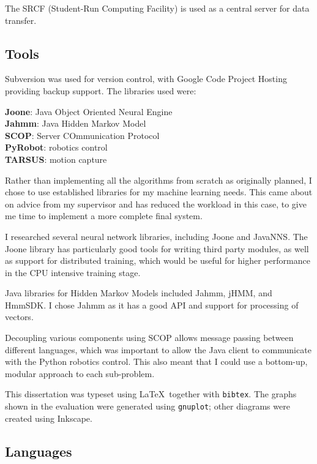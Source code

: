 \documentclass[12pt,a4,notitlepage]{report}
\renewcommand{\_}{\texttt{\symbol{95}}}
\newcommand{\<}{\texttt{\symbol{60}}}
\renewcommand{\>}{\texttt{\symbol{62}}}
\begin{document}
The SRCF (Student-Run Computing Facility\cite{SRCF}) is used as a central server for data transfer.

\subsection{Tools}

Subversion was used for version control, with Google Code Project Hosting providing backup support. The libraries used were:

\textbf{Joone}: Java Object Oriented Neural Engine \cite{Joone}\\
\textbf{Jahmm}: Java Hidden Markov Model \cite{Jahmm} \\
\textbf{SCOP}: Server COmmunication Protocol \cite{SCOP} \\
\textbf{PyRobot}: robotics control \cite{PyRobot}\\
\textbf{TARSUS}: motion capture

Rather than implementing all the algorithms from scratch as originally planned, I chose to use established libraries for my machine learning needs. This came about on advice from my supervisor and has reduced the workload in this case, to give me time to implement a more complete final system.

I researched several neural network libraries,
including Joone\cite{Joone} and JavaNNS.
The Joone library has particularly good tools for writing third party modules, as well as support for distributed training, which would be useful for higher performance in the CPU intensive training stage.

Java libraries for Hidden Markov Models included Jahmm\cite{Jahmm}, jHMM, and HmmSDK. I chose Jahmm as it has a good API and support for processing of vectors.

Decoupling various components using SCOP allows message passing between different languages, which was 
important to allow the Java client to communicate with the Python robotics control. This also meant that I could use a bottom-up, modular approach to each sub-problem.

This dissertation was typeset using \LaTeX\, together with \texttt{bibtex}. The graphs shown in the evaluation were generated using \texttt{gnuplot}; other diagrams were created using Inkscape.

\subsection{Languages}
\end{document}
